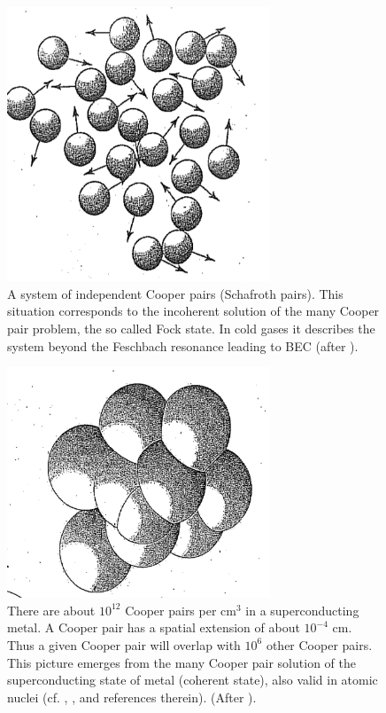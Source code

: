 \begin{figure}
\centerline{\includegraphics*[width=0.7\textwidth,angle=0]{nutshell/figs/fig1A4.pdf}}
\caption{A system of independent Cooper pairs (Schafroth pairs). This situation corresponds to the incoherent solution of the many Cooper pair problem, the so called Fock state. In cold gases it describes the system beyond the Feschbach resonance leading to BEC (after \cite{Rogovin:76}).}\label{fig1A4}
\end{figure}
\begin{figure}
\centerline{\includegraphics*[width=0.7\textwidth,angle=0]{nutshell/figs/fig1A5.pdf}}
\caption{There are about $10^{12}$ Cooper pairs per cm$^{3}$ in a superconducting metal. A Cooper pair has a spatial extension of about $10^{-4}$ cm. Thus a given Cooper pair will overlap with  $10^{6}$ other Cooper pairs. This picture emerges from  the many Cooper pair solution of the superconducting state of metal  (coherent state), also valid in atomic nuclei (cf. \cite{Schrieffer:64}, \cite{Brink:05}, and references therein). (After \cite{Rogovin:76}).}\label{fig1A5}
\end{figure}
